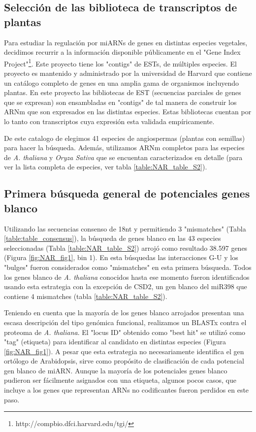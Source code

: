 \subsection{Selección de las biblioteca de transcriptos de plantas}

Para estudiar la regulación por miARNs de genes en distintas especies vegetales, decidimos recurrir a la información disponible públicamente en el "Gene Index Project"\footnote{http://compbio.dfci.harvard.edu/tgi/}.
Este proyecto tiene los "contigs" de ESTs, de múltiples especies.
El proyecto es mantenido y administrado por la universidad de Harvard que contiene un catálogo completo de genes en una amplia gama de organismos incluyendo plantas.
En este proyecto las bibliotecas de EST (secuencias parciales de genes que se expresan) son ensambladas en "contigs" de tal manera de construir los ARNm que son expresados en las distintas especies.
Estas bibliotecas cuentan por lo tanto con transcriptos cuya expresión esta validada empíricamente.

De este catalogo de elegimos 41 especies de angiospermas (plantas con semillas) para hacer la búsqueda.
Además, utilizamos ARNm completos para las especies de \textit{A. thaliana} y \textit{Oryza Sativa}  que se encuentan caracterizados en detalle (para ver la lista completa de especies, ver tabla \ref{table:NAR_table_S2}).

\subsection{Primera búsqueda general de potenciales genes blanco}
Utilizando las secuencias consenso de 18nt y permitiendo 3 "mismatches" (Tabla \ref{table:table_consensus}), la búsqueda de genes blanco en las 43 especies seleccionadas (Tabla \ref{table:NAR_table_S2}) arrojó como resultado 38.597 genes (Figura \ref{fig:NAR_fig1}, bin 1).
En esta búsquedas las interacciones G-U y los "bulges" fueron considerados como "mismatches" en esta primera búsqueda.
Todos los genes blanco de  \textit{A. thaliana} conocidos hasta ese momento fueron identificados usando esta estrategia con la excepción de CSD2, un gen blanco del miR398 que contiene 4 mismatches (tabla \ref{table:NAR_table_S2}).

Teniendo en cuenta que la mayoría de los genes blanco arrojados presentan una escasa descripción del tipo genómica funcional, realizamos un BLASTx  contra el proteoma de \textit{A. thaliana}.
El "locus ID" obtenido como "best hit" se utilizó como "tag" (etiqueta) para identificar al candidato en distintas especies (Figura \ref{fig:NAR_fig1}).
A pesar que esta estrategia no necesariamente identifica el gen ortólogo de Arabidopsis, sirve como propósito de clasificación de cada potencial gen blanco de miARN.
Aunque la mayoría de los potenciales genes blanco pudieron ser fácilmente asignados con una etiqueta, algunos pocos casos, que incluye a los genes que representan ARNs no codificantes fueron perdidos en este paso.

